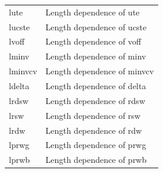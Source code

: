 \begin{longtable}{l l}
{\small lute} & {\small Length dependence of ute} \\
{\small lucste} & {\small Length dependence of ucste} \\
{\small lvoff} & {\small Length dependence of voff} \\
{\small lminv} & {\small Length dependence of minv} \\
{\small lminvcv} & {\small Length dependence of minvcv} \\
{\small ldelta} & {\small Length dependence of delta} \\
{\small lrdsw} & {\small Length dependence of rdsw } \\    
{\small lrsw} & {\small Length dependence of rsw} \\
{\small lrdw} & {\small Length dependence of rdw} \\

{\small lprwg} & {\small Length dependence of prwg } \\    
{\small lprwb} & {\small Length dependence of prwb } \\    


\end{longtable}
